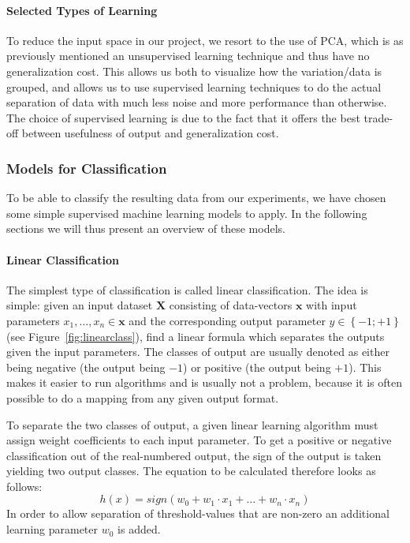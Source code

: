\paragraph{Selected Types of Learning}
\label{par:SelectedTypesofLearning}
To reduce the input space in our project, we resort to the use of PCA, which is as previously mentioned an unsupervised learning technique
and thus have no generalization cost. This allows us both to visualize how the variation/data is grouped, and allows us to
use supervised learning techniques to do the actual separation of data with much less noise and more performance than otherwise.
The choice of supervised learning is due to the fact that it offers the best trade-off between usefulness of output and generalization cost.

\subsubsection{Models for Classification}
\label{ssub:ModelsforClassification}
To be able to classify the resulting data from our experiments, we have chosen some simple supervised machine learning models to apply.
In the following sections we will thus present an overview of these models.
\paragraph{Linear Classification}
\label{par:LinearClassification}
The simplest type of classification is called linear classification.
The idea is simple: given an input dataset $\mathbf{X}$ consisting of data-vectors $\mathbf{x}$ with input parameters $x_1, \dots, x_n \in \mathbf{x}$ and the corresponding output parameter $y \in \left\{-1;+1\right\}$ (see Figure~\ref{fig:linearclass}), 
find a linear formula which separates the outputs given the input parameters.
The classes of output are usually denoted as either being negative (the output being $-1$) or positive (the output being $+1$). 
This makes it easier to run algorithms and is usually not a problem, because it is often possible to do a mapping from any given output format.\\
\begin{minipage}{\linewidth}
\centering
{}
\label{fig:linearclass}
\end{minipage}
To separate the two classes of output, a given linear learning algorithm must assign weight coefficients to each input parameter.
To get a positive or negative classification out of the real-numbered output, the sign of the output is taken yielding two output classes.
The equation to be calculated therefore looks as follows:
$$ h(x) = sign(w_0 + w_1 \cdot x_1 + \dots + w_n \cdot x_n ) $$
In order to allow separation of threshold-values that are non-zero an additional learning parameter $w_0$ is added.

